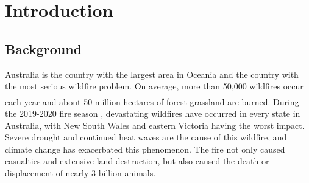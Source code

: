 \documentclass{mcmthesis}
\newcommand{\upcite}[1]{\textsuperscript{\textsuperscript{\cite{#1}}}}
\begin{document}
\maketitle         %
\tableofcontents   %
\newpage
 
 
\section{Introduction}
\subsection{Background}
Australia is the country with the largest area in Oceania and the country with the most serious wildfire problem. On average, more than 50,000 wildfires occur each year and about 50 million hectares of forest grassland are burned. \upcite{c_building}During the 2019-2020 fire season , devastating wildfires have occurred in every state in Australia, with New South Wales and eastern Victoria having the worst impact. Severe drought and continued heat waves are the cause of this wildfire, and climate change has exacerbated this phenomenon. The fire not only caused casualties and extensive land destruction, but also caused the death or displacement of nearly 3 billion animals.
\end{document}
